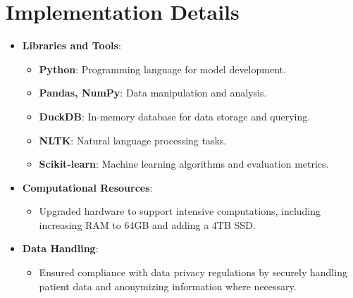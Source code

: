 \documentclass[12pt,a4paper]{report}
\begin{document}
\section{Implementation Details}
\begin{itemize}
    \item \textbf{Libraries and Tools}:
    \begin{itemize}
        \item \textbf{Python}: Programming language for model development.
        \item \textbf{Pandas, NumPy}: Data manipulation and analysis.
        \item \textbf{DuckDB}: In-memory database for data storage and querying.
        \item \textbf{NLTK}: Natural language processing tasks.
        \item \textbf{Scikit-learn}: Machine learning algorithms and evaluation metrics.
    \end{itemize}
    \item \textbf{Computational Resources}:
    \begin{itemize}
        \item Upgraded hardware to support intensive computations, including increasing RAM to 64GB and adding a 4TB SSD.
    \end{itemize}
    \item \textbf{Data Handling}:
    \begin{itemize}
        \item Ensured compliance with data privacy regulations by securely handling patient data and anonymizing information where necessary.
    \end{itemize}
\end{itemize}
\end{document}
